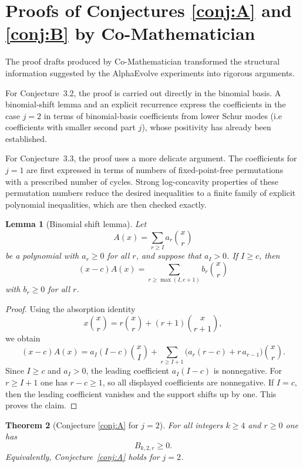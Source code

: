 \documentclass[11pt]{amsart}
\numberwithin{equation}{section}
\newtheorem{theorem}{Theorem}[section]
\newtheorem{lemma}[theorem]{Lemma}
\theoremstyle{remark}
\begin{document}
\section{Proofs of Conjectures \ref{conj:A} and \ref{conj:B} by Co-Mathematician}\label{sec:detective-proofs}
The proof drafts produced by Co-Mathematician transformed the structural information suggested by the AlphaEvolve experiments into rigorous arguments. 

For Conjecture~3.2, the proof is carried out directly in the binomial
basis.  A binomial-shift lemma and an explicit recurrence express the
coefficients in the case $j=2$ in terms of binomial-basis coefficients
from lower Schur modes (i.e coefficients with smaller second part $j$), whose positivity has already been established.

For Conjecture~3.3, the proof uses a more delicate argument.  The
coefficients for $j=1$ are first expressed in terms of numbers of
fixed-point-free permutations with a prescribed number of cycles.  Strong
log-concavity properties of these permutation numbers reduce the desired
inequalities to a finite family of explicit polynomial inequalities, which
are then checked exactly.
\begin{lemma}[Binomial shift lemma]\label{lem:binomial-shift}
Let
\[
  A(x)=\sum_{r\ge I} a_r\binom{x}{r}
\]
be a polynomial with $a_r\ge0$ for all $r$, and suppose that $a_I>0$.  If $I\ge c$, then
\[
  (x-c)A(x)=\sum_{r\ge \max(I,c+1)} b_r\binom{x}{r}
\]
with $b_r\ge0$ for all $r$.
\end{lemma}

\begin{proof}
Using the absorption identity
\[
  x\binom{x}{r}=r\binom{x}{r}+(r+1)\binom{x}{r+1},
\]
we obtain
\[
  (x-c)A(x)=a_I(I-c)\binom{x}{I}
  +\sum_{r\ge I+1}\bigl(a_r(r-c)+r\,a_{r-1}\bigr)\binom{x}{r}.
\]
Since $I\ge c$ and $a_I>0$, the leading coefficient $a_I(I-c)$ is nonnegative.  For $r\ge I+1$ one has $r-c\ge1$, so all displayed coefficients are nonnegative.  If $I=c$, then the leading coefficient vanishes and the support shifts up by one.  This proves the claim.
\end{proof}

\begin{theorem}[Conjecture \ref{conj:A} for $j=2$]\label{thm:A1-solved}
For all integers $k\ge4$ and $r\ge0$ one has
\[
  B_{k,2,r}\ge0.
\]
Equivalently, Conjecture~\ref{conj:A} holds for $j=2$.
\end{theorem}
\end{document}
